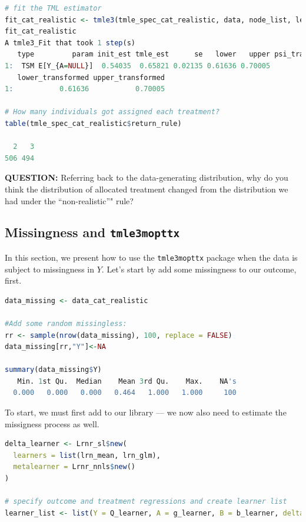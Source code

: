 \documentclass[
  12pt, krantz2,
]{krantz}
\newcommand{\passthrough}[1]{#1}
\newcommand{\1}{\mathbbm{1}}
\theoremstyle{definition}
\theoremstyle{definition}
\theoremstyle{definition}
\theoremstyle{definition}
\theoremstyle{remark}
\begin{document}
\begin{lstlisting}[language=R]
# fit the TML estimator
fit_cat_realistic <- tmle3(tmle_spec_cat_realistic, data, node_list, learner_list)
fit_cat_realistic
A tmle3_Fit that took 1 step(s)
   type         param init_est tmle_est      se   lower   upper psi_transformed
1:  TSM E[Y_{A=NULL}]  0.54035  0.65821 0.02135 0.61636 0.70005         0.65821
   lower_transformed upper_transformed
1:           0.61636           0.70005

# How many individuals got assigned each treatment?
table(tmle_spec_cat_realistic$return_rule)

  2   3 
506 494 
\end{lstlisting}

\textbf{QUESTION:} Referring back to the data-generating distribution, why do you
think the distribution of allocated treatment changed from the distribution
we had under the ``non-realistic''" rule?

\hypertarget{missingness-and-tmle3mopttx}{%
\subsection{\texorpdfstring{Missingness and \texttt{tmle3mopttx}}{Missingness and tmle3mopttx}}\label{missingness-and-tmle3mopttx}}

In this section, we present how to use the \passthrough{\lstinline!tmle3mopttx!} package when the data is subject
to missingness in \(Y\). Let's start by add some missingness to our outcome, first.

\begin{lstlisting}[language=R]
data_missing <- data_cat_realistic

#Add some random missingless:
rr <- sample(nrow(data_missing), 100, replace = FALSE)
data_missing[rr,"Y"]<-NA

summary(data_missing$Y)
   Min. 1st Qu.  Median    Mean 3rd Qu.    Max.    NA's 
  0.000   0.000   0.000   0.464   1.000   1.000     100 
\end{lstlisting}

To start, we must first add to our library --- we now also need to estimate the
missigness process as well.

\begin{lstlisting}[language=R]
delta_learner <- Lrnr_sl$new(
  learners = list(lrn_mean, lrn_glm),
  metalearner = Lrnr_nnls$new()
)

# specify outcome and treatment regressions and create learner list
learner_list <- list(Y = Q_learner, A = g_learner, B = b_learner, delta_Y=delta_learner)
\end{lstlisting}
\end{document}
